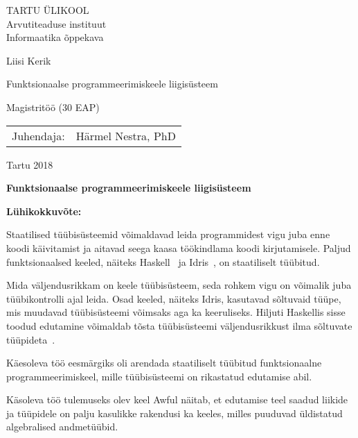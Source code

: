 \documentclass[12pt]{article}
\def\pealkiri{Funktsionaalse programmeerimiskeele liigisüsteem}
\begin{document}
  \thispagestyle{empty}
  \begin{center}
    \large
      TARTU ÜLIKOOL\\
      Arvutiteaduse instituut\\
      Informaatika õppekava

    \vspace{25mm}

    \Large
      Liisi Kerik

    \vspace{4mm}

    \huge
      \pealkiri

    \vspace{20mm}

    \Large
      Magistritöö (30 EAP)
  \end{center}

  \vspace{2mm}

  \begin{flushright}
    \begin{tabular}{rl} 
      Juhendaja: & Härmel Nestra, PhD
    \end{tabular}
  \end{flushright}
  \vfill
  \centerline{Tartu 2018}
  \newpage
  \noindent
  \textbf{\large\pealkiri}

  \vspace*{1ex}

  \noindent
  \textbf{Lühikokkuvõte:} 

  \noindent
  Staatilised tüübisüsteemid võimaldavad leida programmidest vigu juba enne koodi käivitamist ja aitavad seega kaasa töökindlama koodi kirjutamisele. Paljud funktsionaalsed keeled, näiteks Haskell~\cite{Gla} ja Idris~\cite{The_Idr}, on staatiliselt tüübitud.

  Mida väljendusrikkam on keele tüübisüsteem, seda rohkem vigu on võimalik juba tüübikontrolli ajal leida. Osad keeled, näiteks Idris, kasutavad sõltuvaid tüüpe, mis muudavad tüübisüsteemi võimsaks aga ka keeruliseks. Hiljuti Haskellis sisse toodud edutamine võimaldab tõsta tüübisüsteemi väljendusrikkust ilma sõltuvate tüüpideta~\cite{Giv}.

  Käesoleva töö eesmärgiks oli arendada staatiliselt tüübitud funktsionaalne programmeerimiskeel, mille tüübisüsteemi on rikastatud edutamise abil.

  Käsoleva töö tulemuseks olev keel Awful näitab, et edutamise teel saadud liikide ja tüüpidele on palju kasulikke rakendusi ka keeles, milles puuduvad üldistatud algebralised andmetüübid.
\end{document}
